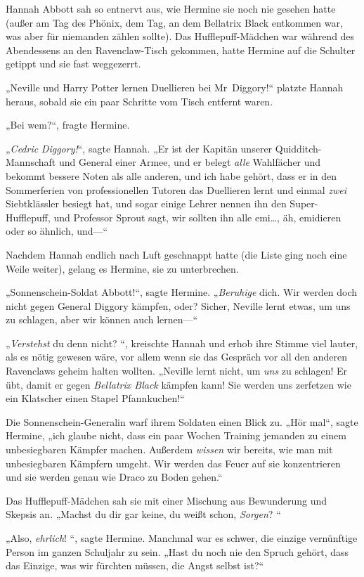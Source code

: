 {Hannah Abbott sah so entnervt aus, wie Hermine sie noch nie gesehen hatte (außer am Tag des Phönix, dem Tag, an dem Bellatrix Black entkommen war, was aber für niemanden zählen sollte). Das Hufflepuff-Mädchen war während des Abendessens an den Ravenclaw-Tisch gekommen, hatte Hermine auf die Schulter getippt und sie fast weggezerrt.

„Neville und Harry Potter lernen Duellieren bei Mr~Diggory!“ platzte Hannah heraus, sobald sie ein paar Schritte vom Tisch entfernt waren.

„Bei wem?“, fragte Hermine.

„\emph{Cedric} \emph{Diggory!}“, sagte Hannah. „Er ist der Kapitän unserer Quidditch-Mannschaft und General einer Armee, und er belegt \emph{alle} Wahlfächer und bekommt bessere Noten als alle anderen, und ich habe gehört, dass er in den Sommerferien von professionellen Tutoren das Duellieren lernt und einmal \emph{zwei} Siebtklässler besiegt hat, und sogar einige Lehrer nennen ihn den Super-Hufflepuff, und Professor Sprout sagt, wir sollten ihn alle emi…, äh, emidieren oder so ähnlich, und—“

Nachdem Hannah endlich nach Luft geschnappt hatte (die Liste ging noch eine Weile weiter), gelang es Hermine, sie zu unterbrechen.

„Sonnenschein-Soldat Abbott!“, sagte Hermine. „\emph{Beruhige} dich. Wir werden doch nicht gegen General Diggory kämpfen, oder? Sicher, Neville lernt etwas, um uns zu schlagen, aber wir können auch lernen—“

„\emph{Verstehst} du denn nicht? “, kreischte Hannah und erhob ihre Stimme viel lauter, als es nötig gewesen wäre, vor allem wenn sie das Gespräch vor all den anderen Ravenclaws geheim halten wollten. „Neville lernt nicht, um \emph{uns} zu schlagen! Er übt, damit er gegen \emph{Bellatrix Black} kämpfen kann! Sie werden uns zerfetzen wie ein Klatscher einen Stapel Pfannkuchen!“

Die Sonnenschein-Generalin warf ihrem Soldaten einen Blick zu. „Hör mal“, sagte Hermine, „ich glaube nicht, dass ein paar Wochen Training jemanden zu einem unbesiegbaren Kämpfer machen. Außerdem \emph{wissen} wir bereits, wie man mit unbesiegbaren Kämpfern umgeht. Wir werden das Feuer auf sie konzentrieren und sie werden genau wie Draco zu Boden gehen.“

Das Hufflepuff-Mädchen sah sie mit einer Mischung aus Bewunderung und Skepsis an. „Machst du dir gar keine, du weißt schon, \emph{Sorgen}? “

„Also, \emph{ehrlich}! “, sagte Hermine. Manchmal war es schwer, die einzige vernünftige Person im ganzen Schuljahr zu sein. „Hast du noch nie den Spruch gehört, dass das Einzige, was wir fürchten müssen, die Angst selbst ist?“

}
